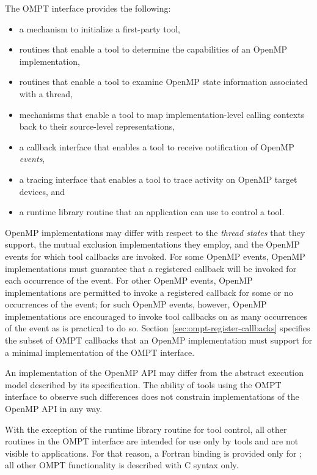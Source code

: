 The OMPT interface provides the following: 
\begin{itemize}
\item a mechanism to initialize a first-party tool,
\item routines that enable a tool to determine the capabilities of an
  OpenMP implementation,
\item routines that enable a tool to examine OpenMP state information associated with a thread,
\item mechanisms that enable a tool to map implementation-level calling
  contexts back to their source-level representations,
\item a callback interface that enables a tool to receive notification
  of OpenMP \emph{events},
\item a tracing interface that enables a tool to trace activity on OpenMP target devices, and
\item a runtime library routine that an application can use to control a tool.
\end{itemize}

OpenMP implementations may differ with respect to the \emph{thread states} that
they support, the mutual exclusion implementations they employ, 
and the OpenMP events for which tool callbacks are invoked. For some OpenMP events,
OpenMP implementations must guarantee that a registered callback will be invoked for each occurrence of the
event. For other OpenMP events, OpenMP implementations are permitted to invoke a registered callback for some
or no occurrences of the event; for such
OpenMP events, however,
OpenMP implementations are encouraged to invoke tool callbacks on as
many occurrences of the event as is practical to do so.
Section~\ref{sec:ompt-register-callbacks} specifies the subset of OMPT
callbacks that an OpenMP implementation must support for a minimal
implementation of the OMPT interface.

An implementation of the OpenMP API may differ from the
abstract execution model described by its specification.  The ability
of tools using the OMPT interface to observe such differences does not constrain
implementations of the OpenMP API in any way. 

With the exception of the  runtime library routine for tool control, 
all other routines in the OMPT interface are intended for use only by tools and
are not visible to applications.
For that reason, a Fortran binding is provided only 
for ;
all other OMPT functionality is described with C syntax only.

